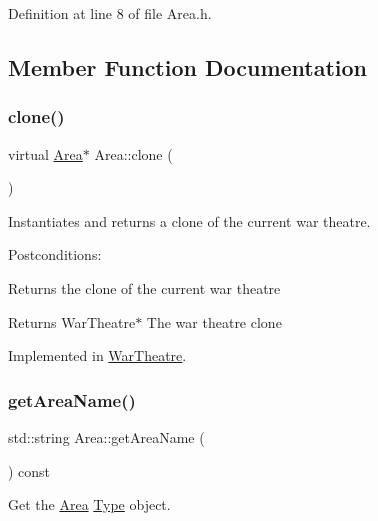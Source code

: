 Definition at line 8 of file Area.\+h.



\subsection{Member Function Documentation}
\mbox{\label{classArea_a383d61c76b8fac66ef903036d776a3a4}} 
\subsubsection{\texorpdfstring{clone()}{clone()}}
{\footnotesize\ttfamily virtual \hyperlink{classArea}{Area}$\ast$ Area\+::clone (\begin{DoxyParamCaption}{ }\end{DoxyParamCaption})\hspace{0.3cm}{\ttfamily [pure virtual]}}



Instantiates and returns a clone of the current war theatre. 

Postconditions\+:
\begin{DoxyItemize}
\item Returns the clone of the current war theatre
\end{DoxyItemize}

\begin{DoxyReturn}{Returns}
War\+Theatre$\ast$ The war theatre clone 
\end{DoxyReturn}


Implemented in \hyperlink{classWarTheatre_afc32ceef9af26ba4e858c91bf769aef9}{War\+Theatre}.

\mbox{\label{classArea_ad67916df281b6b172c4423627b65062a}} 
\subsubsection{\texorpdfstring{get\+Area\+Name()}{getAreaName()}}
{\footnotesize\ttfamily std\+::string Area\+::get\+Area\+Name (\begin{DoxyParamCaption}{ }\end{DoxyParamCaption}) const}



Get the \hyperlink{classArea}{Area} \hyperlink{classType}{Type} object. 

